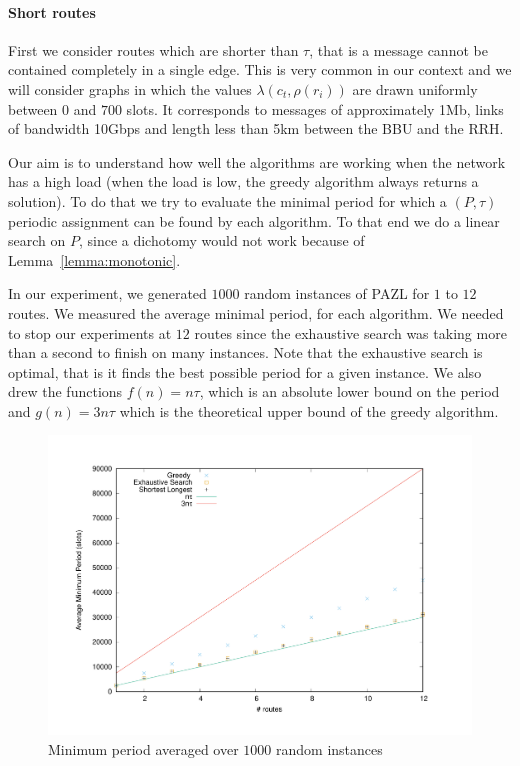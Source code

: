 \documentclass[a4paper,10pt]{article}
\begin{document}
      \paragraph{Short routes}
      
      First we consider routes which are shorter than $\tau$, that is a message cannot be contained 
      completely in a single edge. This is very common in our context and we will consider graphs in which the values $\lambda(c_t,\rho(r_{i}))$ are drawn uniformly between $0$ and $700$ slots. It corresponds to messages of approximately 1Mb, links of bandwidth 10Gbps and length less than 5km between the BBU and the RRH. 
      
      Our aim is to understand how well the algorithms are working when the network has a high load (when 
      the load is low, the greedy algorithm always returns a solution). To do that we try to evaluate the 
      minimal period for which a $(P,\tau)$ periodic assignment can be found by each algorithm. 
      To that end we do a linear search on $P$, since a dichotomy would not work because of Lemma~\ref{lemma:monotonic}.
      
      In our experiment, we generated $1000$ random instances of PAZL for $1$ to $12$ routes. 
      We measured the average minimal period, for each algorithm. We needed to stop our experiments at $12$ routes since the exhaustive search was taking more than a second to finish on many instances.
      Note that the exhaustive search is optimal, that is it finds the best possible period for a given instance. 
      We also drew the functions $f(n) = n\tau$, which is an absolute lower bound on the period and $g(n) = 3n\tau$ which is the theoretical upper bound of the greedy algorithm.
      
      
        
      \begin{figure}

      \begin{center}
	\includegraphics[scale=0.4]{periode_petite.pdf}
      \end{center}
      \caption{Minimum period averaged over $1000$ random instances}
      \end{figure}
      
\end{document}
